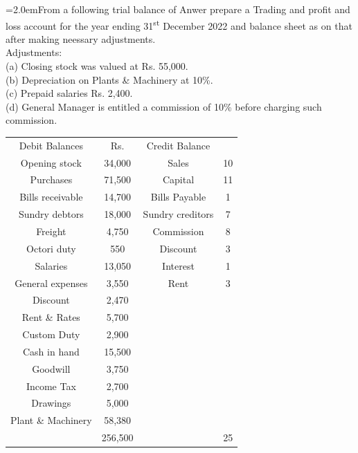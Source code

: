 \documentclass[11pt,a4paper]{article}
\newcommand{\lqn}[2]{\Needspace{6\baselineskip}\par\medskip\noindent\hangindent=2.0em\hangafter=1\makebox[2.0em][l]{\textbf{#1.}}#2\par}
\begin{document}
\lqn{108}{From a following trial balance of Anwer prepare a Trading and profit and loss account for the year ending 31\textsuperscript{st} December 2022 and balance sheet as on that after making neessary adjustments.\\
Adjustments:\\
(a) Closing stock was valued at Rs. 55,000.\\
(b) Depreciation on Plants \& Machinery at 10\%.\\
(c) Prepaid salaries Rs. 2,400.\\
(d) General Manager is entitled a commission of 10\% before charging such commission.\par
\par\smallskip\noindent\hspace*{1.2em}\begin{tabular}{|cccc|}
\hline
Debit Balances & Rs. & Credit Balance &  \\
Opening stock & 34,000 & Sales & 10 \\
Purchases & 71,500 & Capital & 11 \\
Bills receivable & 14,700 & Bills Payable & 1 \\
Sundry debtors & 18,000 & Sundry creditors & 7 \\
Freight & 4,750 & Commission & 8 \\
Octori duty & 550 & Discount & 3 \\
Salaries & 13,050 & Interest & 1 \\
General expenses & 3,550 & Rent & 3 \\
Discount & 2,470 &  &  \\
Rent \& Rates & 5,700 &  &  \\
Custom Duty & 2,900 &  &  \\
Cash in hand & 15,500 &  &  \\
Goodwill & 3,750 &  &  \\
Income Tax & 2,700 &  &  \\
Drawings & 5,000 &  &  \\
Plant \& Machinery & 58,380 &  &  \\
 & 256,500 &  & 25 \\
\hline
\end{tabular}\par\smallskip
}
\end{document}
